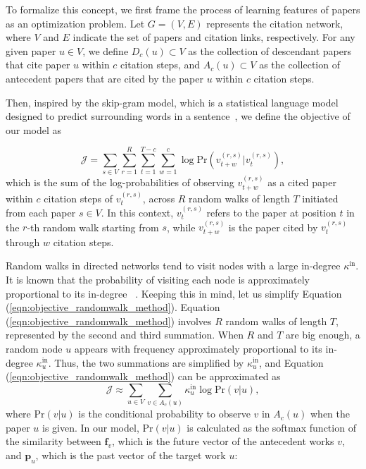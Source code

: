 \documentclass[12pt]{article}
\begin{document}
\begin{refsection}
To formalize this concept, we first frame the process of learning features of papers as an optimization problem. Let $G = (V, E)$ represents the citation network, where $V$ and $E$ indicate the set of papers and citation links, respectively. For any given paper $u \in V$, we define $D_c(u) \subset V$ as the collection of descendant papers that cite paper $u$ within $c$ citation steps, and $A_c(u) \subset V$ as the collection of antecedent papers that are cited by the paper $u$ within $c$ citation steps.

Then, inspired by the skip-gram model, which is a statistical language model designed to predict surrounding words in a sentence~\cite{mikolov2013distributed}, we define the objective of our model as 

\begin{equation}\label{eqn:objective_randomwalk_method}
\mathcal{J} = \sum_{s\in V} \sum_{r=1}^{R} \sum_{t=1}^{T - c} \sum_{w=1}^{c} \log \text{Pr}(v_{t+w}^{(r, s)} | v_t^{(r, s)}),
\end{equation}
which is the sum of the log-probabilities of observing $v_{t+w}^{(r, s)}$ as a cited paper within $c$ citation steps of $v_t^{(r, s)}$, across $R$ random walks of length $T$ initiated from each paper $s \in V$. In this context, $v_{t}^{(r, s)}$ refers to the paper at position $t$ in the $r$-th random walk starting from $s$, while $v_{t+w}^{(r, s)}$ is the paper cited by $v_{t}^{(r, s)}$ through $w$ citation steps.


Random walks in directed networks tend to visit nodes with a large in-degree $\kappa^{\text{in}}$. It is known that the probability of visiting each node is approximately proportional to its in-degree ~\cite{fortunato2007random}. Keeping this in mind, let us simplify Equation (\ref{eqn:objective_randomwalk_method}). Equation (\ref{eqn:objective_randomwalk_method}) involves $R$ random walks of length $T$, represented by the second and third summation. When $R$ and $T$ are big enough, a random node $u$ appears with frequency approximately proportional to its in-degree $\kappa^{\text{in}}_u$. Thus, the two summations are simplified by $\kappa^{\text{in}}_u$,  and Equation (\ref{eqn:objective_randomwalk_method}) can be approximated as 
\begin{equation}\label{eqn:objective}
\mathcal{J} \approx \sum_{u \in V} \sum_{v \in A_c(u)} \kappa_u^{\text{in}}\log \text{Pr}(v | u),
\end{equation}
where $\text{Pr} (v|u)$ is the conditional probability to observe $v$ in $A_c(u)$ when the paper $u$ is given. In our model,  $\text{Pr} (v|u)$ is calculated as the softmax function of the similarity between $\mathbf{f}_v$, which is the future vector of the antecedent works $v$, and $\mathbf{p}_u$, which is the past vector of the target work $u$:


\end{refsection}
\end{document}
